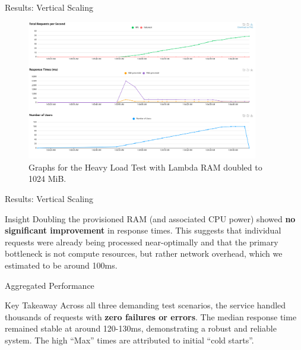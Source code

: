 \documentclass{beamer}
\begin{document}
\begin{frame}{Results: Vertical Scaling}
    \begin{figure}[H]
        \centering
        \includegraphics[width=0.9\textwidth]{heavy_scale_graphs.png}
        \caption{Graphs for the Heavy Load Test with Lambda RAM doubled to 1024 MiB.}
    \end{figure}
\end{frame}

\begin{frame}{Results: Vertical Scaling}
    \begin{block}{Insight}
        Doubling the provisioned RAM (and associated CPU power) showed \textbf{no significant improvement} in response times. This suggests that individual requests were already being processed near-optimally and that the primary bottleneck is not compute resources, but rather network overhead, which we estimated to be around 100ms.
    \end{block}
\end{frame}

\begin{frame}{Aggregated Performance}
    \begin{alertblock}{Key Takeaway}
        Across all three demanding test scenarios, the service handled thousands of requests with \textbf{zero failures or errors}. The median response time remained stable at around 120-130ms, demonstrating a robust and reliable system. The high ``Max'' times are attributed to initial ``cold starts''.
    \end{alertblock}
\end{frame}
\end{document}
